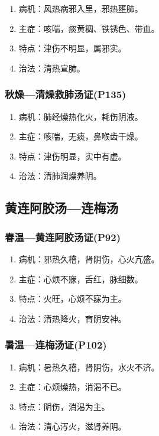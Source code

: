 \documentclass[cn,black,12pt,founder,normal,twocolumn]{elegantnote}
\begin{document}
\begin{enumerate}
    \item 病机：风热病邪入里，邪热壅肺。
    \item 主症：咳喘，痰黄稠、铁锈色、带血。
    \item 特点：津伤不明显，属邪实。
    \item 治法：清热宣肺。
\end{enumerate}

\subsubsection{秋燥—清燥救肺汤证(P135)}

\begin{enumerate}
    \item 病机：肺经燥热化火，耗伤阴液。
    \item 主症：咳喘，无痰，鼻喉齿干燥。
    \item 特点：津伤明显，实中有虚。
    \item 治法：清肺润燥养阴。
\end{enumerate}

\subsection{黄连阿胶汤—连梅汤}

\subsubsection{春温—黄连阿胶汤证(P92)}

\begin{enumerate}
    \item 病机：邪热久稽，肾阴伤，心火亢盛。
    \item 主症：心烦不寐，舌红，脉细数。
    \item 特点：火旺，心烦不寐为主。
    \item 治法：清热降火，育阴安神。
\end{enumerate}

\subsubsection{暑温—连梅汤证(P102)}

\begin{enumerate}
    \item 病机：暑热久稽，肾阴伤，水火不济。
    \item 主症：心烦燥热，消渴不已。
    \item 特点：阴伤，消渴为主。
    \item 治法：清心泻火，滋肾养阴。
\end{enumerate}
\end{document}
